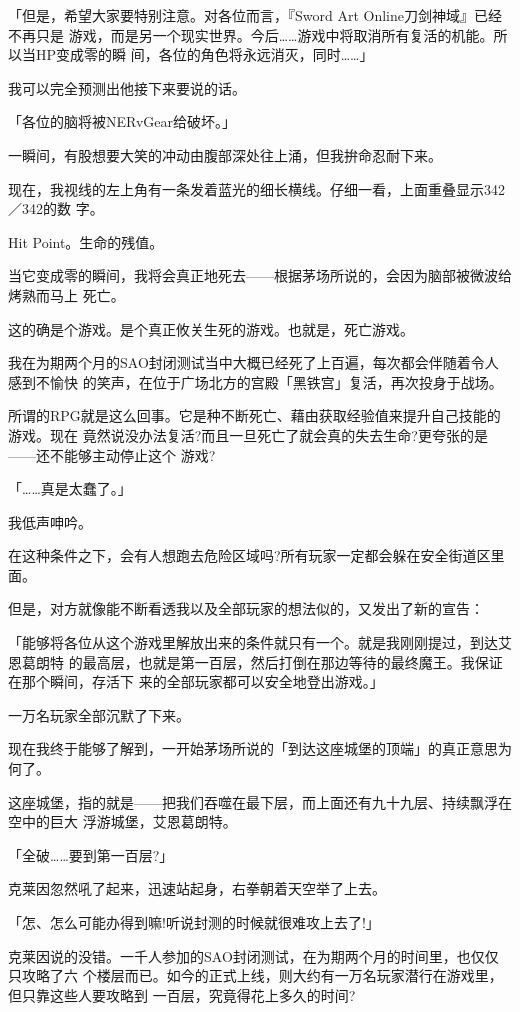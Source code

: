 \documentclass[11pt]{book}
\begin{document}
「但是，希望大家要特别注意。对各位而言，『Sword Art Online刀剑神域』已经不再只是
游戏，而是另一个现实世界。今后……游戏中将取消所有复活的机能。所以当HP变成零的瞬
间，各位的角色将永远消灭，同时……」

我可以完全预测出他接下来要说的话。

「各位的脑将被NERvGear给破坏。」

一瞬间，有股想要大笑的冲动由腹部深处往上涌，但我拚命忍耐下来。

现在，我视线的左上角有一条发着蓝光的细长横线。仔细一看，上面重叠显示342／342的数
字。

Hit Point。生命的残值。

当它变成零的瞬间，我将会真正地死去——根据茅场所说的，会因为脑部被微波给烤熟而马上
死亡。

这的确是个游戏。是个真正攸关生死的游戏。也就是，死亡游戏。

我在为期两个月的SAO封闭测试当中大概已经死了上百遍，每次都会伴随着令人感到不愉快
的笑声，在位于广场北方的宫殿「黑铁宫」复活，再次投身于战场。

所谓的RPG就是这么回事。它是种不断死亡、藉由获取经验值来提升自己技能的游戏。现在
竟然说没办法复活?而且一旦死亡了就会真的失去生命?更夸张的是——还不能够主动停止这个
游戏?

「……真是太蠢了。」

我低声呻吟。

在这种条件之下，会有人想跑去危险区域吗?所有玩家一定都会躲在安全街道区里面。

但是，对方就像能不断看透我以及全部玩家的想法似的，又发出了新的宣告：

「能够将各位从这个游戏里解放出来的条件就只有一个。就是我刚刚提过，到达艾恩葛朗特
的最高层，也就是第一百层，然后打倒在那边等待的最终魔王。我保证在那个瞬间，存活下
来的全部玩家都可以安全地登出游戏。」

一万名玩家全部沉默了下来。

现在我终于能够了解到，一开始茅场所说的「到达这座城堡的顶端」的真正意思为何了。

这座城堡，指的就是——把我们吞噬在最下层，而上面还有九十九层、持续飘浮在空中的巨大
浮游城堡，艾恩葛朗特。

「全破……要到第一百层?」

克莱因忽然吼了起来，迅速站起身，右拳朝着天空举了上去。

「怎、怎么可能办得到嘛!听说封测的时候就很难攻上去了!」

克莱因说的没错。一千人参加的SAO封闭测试，在为期两个月的时间里，也仅仅只攻略了六
个楼层而已。如今的正式上线，则大约有一万名玩家潜行在游戏里，但只靠这些人要攻略到
一百层，究竟得花上多久的时间?
\end{document}
